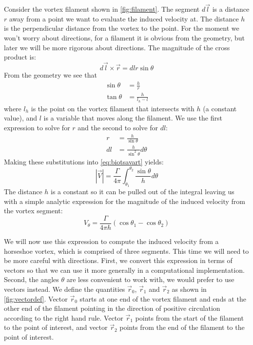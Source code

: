 \documentclass{article}
\begin{document}
Consider the vortex filament shown in \cref{fig:filament}.  The segment $d\vec{l}$ is a distance $r$ away from a point we want to evaluate the induced velocity at.  The distance $h$ is the perpendicular distance from the vortex to the point.  For the moment we won't worry about directions, for a filament it is obvious from the geometry, but later we will be more rigorous about directions.  
The magnitude of the cross product is:
\begin{equation}
d\vec{l} \times \vec{r} = dl r \sin\theta
\end{equation}
From the geometry we see that 
\begin{align}
\sin\theta &= \frac{h}{r}\\
\tan\theta &= \frac{h}{l_h - l}
\end{align}
where $l_h$ is the point on the vortex filament that intersects with $h$ (a constant value), and $l$ is a variable that moves along the filament.  We use the first expression to solve for $r$ and the second to solve for $dl$:
\begin{align}
r &= \frac{h}{\sin\theta}\\
dl &= \frac{h}{\sin^2\theta} d\theta
\end{align}
Making these substitutions into \cref{eq:biotsavart} yields:
\begin{equation}
|\vec{V}| = \frac{\Gamma}{4 \pi} \int_{\theta_1}^{\theta_2} \frac{\sin\theta}{h} d\theta
\end{equation}
The distance $h$ is a constant so it can be pulled out of the integral leaving us with a simple analytic expression for the magnitude of the induced velocity from the vortex segment:
\begin{equation}
V_\theta = \frac{\Gamma}{4 \pi h}(\cos\theta_1 - \cos\theta_2)
\end{equation}

We will now use this expression to compute the induced velocity from a horseshoe vortex, which is comprised of three segments.  This time we will need to be more careful with directions.  First, we convert this expression in terms of vectors so that we can use it more generally in a computational implementation.  Second, the angles $\theta$ are less convenient to work with, we would prefer to use vectors instead.  We define the quantities $\vec{r}_0$, $\vec{r}_1$ and $\vec{r}_2$ as shown in \cref{fig:vectordef}.  Vector $\vec{r}_0$ starts at one end of the vortex filament and ends at the other end of the filament pointing in the direction of positive circulation according to the right hand rule.  Vector $\vec{r}_1$ points from the start of the filament to the point of interest, and vector $\vec{r}_2$ points from the end of the filament to the point of interest.
\end{document}
